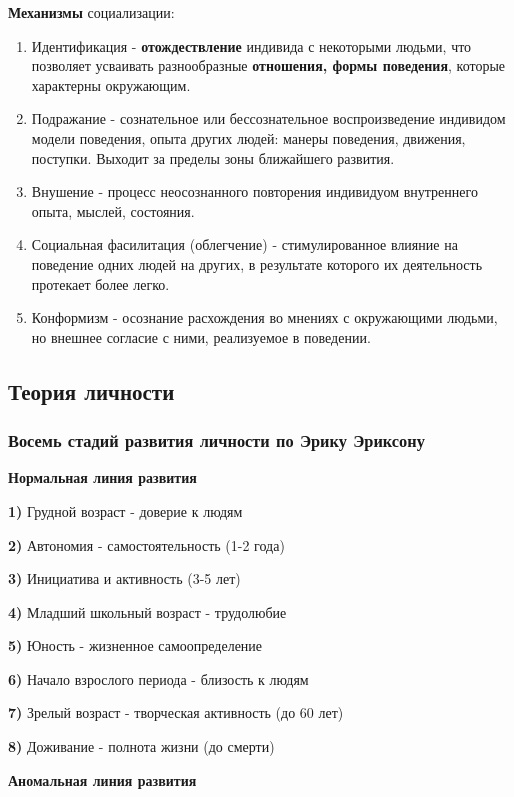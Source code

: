 \documentclass{article}
\begin{document}
\begin{flushleft}
\textbf{Механизмы} социализации:

\begin{enumerate}
    \item Идентификация - \textbf{отождествление} индивида с некоторыми людьми, что позволяет усваивать разнообразные \textbf{отношения, формы поведения}, которые характерны окружающим.
    \item Подражание - сознательное или бессознательное воспроизведение индивидом модели поведения, опыта других людей: манеры поведения, движения, поступки. Выходит за пределы зоны ближайшего развития.
    \item Внушение - процесс неосознанного повторения индивидуом внутреннего опыта, мыслей, состояния.
    \item Социальная фасилитация (облегчение) - стимулированное влияние на поведение одних людей на других, в результате которого их деятельность протекает более легко.
    \item Конформизм - осознание расхождения во мнениях с окружающими людьми, но внешнее согласие с ними, реализуемое в поведении.
\end{enumerate}

\subsection{Теория личности}

\subsubsection{Восемь стадий развития личности по Эрику Эриксону}

\begin{minipage}[t]{0.48\textwidth}
\textbf{Нормальная линия развития}

\bigskip

\textbf{1) } Грудной возраст - доверие к людям

\textbf{2) } Автономия - самостоятельность (1-2 года)

\textbf{3) } Инициатива и активность (3-5 лет)

\textbf{4) } Младший школьный возраст - трудолюбие

\textbf{5) } Юность - жизненное самоопределение

\textbf{6) } Начало взрослого периода - близость к людям

\textbf{7) } Зрелый возраст - творческая активность (до 60 лет)

\textbf{8) } Доживание - полнота жизни (до смерти)
\end{minipage}
\begin{minipage}[t]{0.48\textwidth}
\textbf{Аномальная линия развития}


\end{minipage}
\end{flushleft}
\end{document}
